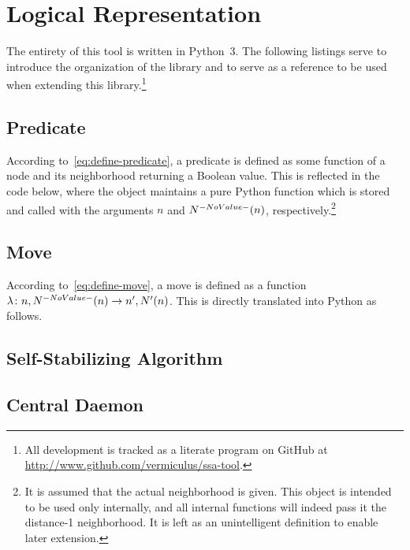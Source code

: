 \section{Logical Representation}
\label{sec:logic-repr}

The entirety of this tool is written in Python~3.
The following listings serve to introduce the organization of the library and
  to serve as a reference to be used when extending this library.\footnote{%
    All development is tracked as a literate program on GitHub
    at \url{http://www.github.com/vermiculus/ssa-tool}.}

\subsection{Predicate}
\label{sec:logic-repr:predicate}

According to~\eqref{eq:define-predicate},
  a \gls{predicate} is defined as some function of
  a node and its neighborhood returning a Boolean value.
This is reflected in the code below,
  where the  object maintains a pure Python function
  which is stored and called with the arguments $n$ and $\OpenNeighborhood{n}$,
  respectively.\footnote{%
    It is assumed that the actual neighborhood is given.
    This object is intended to be used only internally,
      and all internal functions will indeed pass it the distance-1 neighborhood.
    It is left as an unintelligent definition to enable later extension.}


\subsection{Move}
\label{sec:logic-repr:move}

According to~\eqref{eq:define-move},
  a \gls{move} is defined as a function
  $\Function{n, \OpenNeighborhood{n}}{n^\prime, \OpenNeighborhood[\prime]{n}}$.
This is directly translated into Python as follows.


\subsection{Self-Stabilizing Algorithm}
\label{sec:logic-repr:self-stab-algor}


\subsection{Central Daemon}
\label{sec:logic-repr:daemon}

